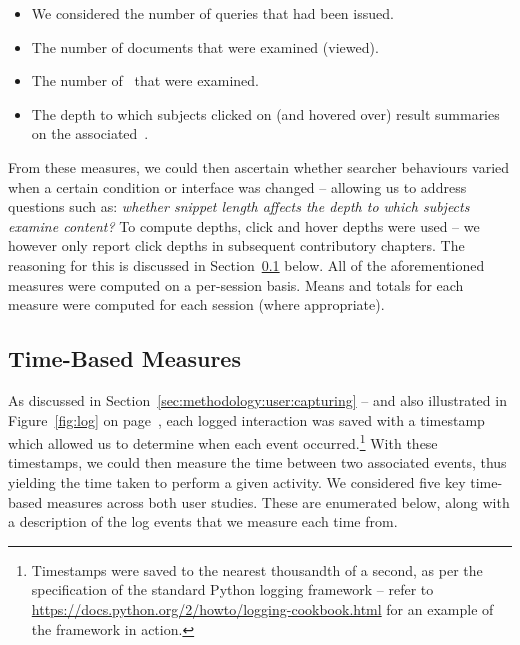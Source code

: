 \begin{itemize}
    \item{ We considered the number of queries that had been issued.}
    \item{ The number of documents that were examined (viewed).}
    \item{ The number of~ that were examined.}
    \item{ The depth to which subjects clicked on (and hovered over) result summaries on the associated~.}
\end{itemize}

From these measures, we could then ascertain whether searcher behaviours varied when a certain condition or interface was changed -- allowing us to address questions such as: \emph{whether snippet length affects the depth to which subjects examine content?} To compute depths, click and hover depths were used -- we however only report click depths in subsequent contributory chapters. The reasoning for this is discussed in Section~\ref{sec:methodology:extracting:time} below. All of the aforementioned measures were computed on a per-session basis. Means and totals for each measure were computed for each session (where appropriate).


\subsection{Time-Based Measures}\label{sec:methodology:extracting:time}
As discussed in Section~\ref{sec:methodology:user:capturing} -- and also illustrated in Figure~\ref{fig:log} on page~\pageref{fig:log}, each logged interaction was saved with a timestamp which allowed us to determine when each event occurred.\footnote{Timestamps were saved to the nearest thousandth of a second, as per the specification of the standard Python logging framework -- refer to \url{https://docs.python.org/2/howto/logging-cookbook.html}  for an example of the framework in action.} With these timestamps, we could then measure the time between two associated events, thus yielding the time taken to perform a given activity. We considered five key time-based measures across both user studies. These are enumerated below, along with a description of the log events that we measure each time from.

